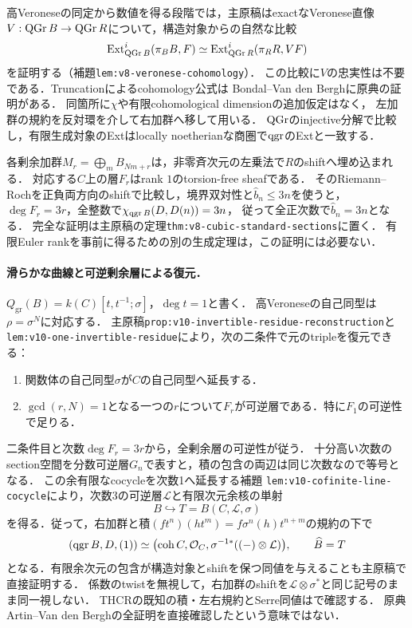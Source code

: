 \documentclass[11pt,a4paper]{ltjsarticle}
\begin{document}
高Veroneseの同定から数値を得る段階では，主原稿はexactなVeronese直像
$V:\operatorname{QGr} B\to\operatorname{QGr} R$について，構造対象からの自然な比較
\[
 \operatorname{Ext}^i_{\operatorname{QGr} B}(\pi_BB,F)
 \simeq\operatorname{Ext}^i_{\operatorname{QGr} R}(\pi_RR,VF)
\]
を証明する（補題\texttt{lem:v8-veronese-cohomology}）．
この比較に$V$の忠実性は不要である．Truncationによるcohomology公式は
Bondal--Van den Bergh\cite[\S4.1, (4.1), Lemmas 4.1.4--4.1.6]{BvdBGenerators}に原典の証明がある．
同箇所に$\chi$や有限cohomological dimensionの追加仮定はなく，
左加群の規約を反対環を介して右加群へ移して用いる．
$\operatorname{QGr}$のinjective分解で比較し，有限生成対象のExtはlocally noetherianな商圏で$\operatorname{qgr}$のExtと一致する．

各剰余加群$M_r=\bigoplus_mB_{Nm+r}$は，非零斉次元の左乗法で$R$のshiftへ埋め込まれる．
対応する$C$上の層$F_r$はrank $1$のtorsion-free sheafである．
そのRiemann--Rochを正負両方向のshiftで比較し，境界双対性と$\widehat b_n\leq3n$を使うと，
$\deg F_r=3r$，全整数で$\chi_{\operatorname{qgr} B}(D,D(n))=3n$，
従って全正次数で$\widehat b_n=3n$となる．
完全な証明は主原稿の定理\texttt{thm:v8-cubic-standard-sections}に置く．
有限Euler rankを事前に得るための別の生成定理は，この証明には必要ない．

\paragraph{滑らかな曲線と可逆剰余層による復元．}
$Q_{\mathrm{gr}}(B)=k(C)[t,t^{-1};\sigma]$，$\deg t=1$と書く．
高Veroneseの自己同型は$\rho=\sigma^N$に対応する．
主原稿\texttt{prop:v10-invertible-residue-reconstruction}と
\texttt{lem:v10-one-invertible-residue}により，次の二条件で元のtripleを復元できる：
\begin{enumerate}[label=(\roman*)]
\item 関数体の自己同型$\sigma$が$C$の自己同型へ延長する．
\item $\gcd(r,N)=1$となる一つの$r$について$F_r$が可逆層である．特に$F_1$の可逆性で足りる．
\end{enumerate}
二条件目と次数$\deg F_r=3r$から，全剰余層の可逆性が従う．
十分高い次数のsection空間を分数可逆層$G_n$で表すと，積の包含の両辺は同じ次数なので等号となる．
この余有限なcocycleを次数1へ延長する補題
\texttt{lem:v10-cofinite-line-cocycle}により，次数3の可逆層$\mathcal L$と有限次元余核の単射
\[
 B\hookrightarrow T=B(C,\mathcal L,\sigma)
\]
を得る．従って，右加群と積$(ft^n)(ht^m)=f\sigma^n(h)t^{n+m}$の規約の下で
\[
 (\operatorname{qgr} B,D,(1))\simeq
 \bigl(\operatorname{coh} C,\mathcal O_C,\sigma^{-1*}((- )\otimes\mathcal L)\bigr),
 \qquad\widehat B=T
\]
となる．有限余次元の包含が構造対象とshiftを保つ同値を与えることも主原稿で直接証明する．
係数のtwistを無視して，右加群のshiftを$\mathcal L\otimes\sigma^*$と同じ記号のまま同一視しない．
THCRの既知の積・左右規約とSerre同値は\cite[\S2.3, Proposition 2.2, Theorem 2.4]{CKSTHCR}で確認する．
原典Artin--Van den Berghの全証明を直接確認したという意味ではない．
\end{document}

